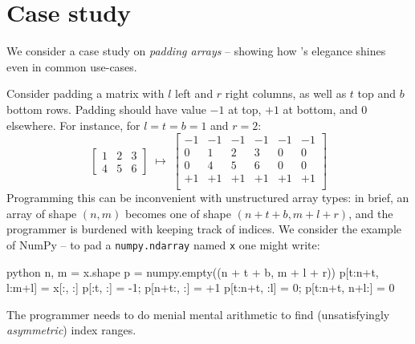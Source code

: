 \section{Case study}

We consider a case study on \emph{padding arrays} -- showing how \starr{}'s elegance shines even in common use-cases.

Consider padding a matrix with $l$ left and $r$ right columns, as well as $t$ top and $b$ bottom rows. Padding should have value $-1$ at top, $+1$ at bottom, and $0$ elsewhere. For instance, for $l = t = b = 1$ and $r = 2$:
$$ \begin{bmatrix}
    1 & 2 & 3 \\ 4 & 5 & 6
\end{bmatrix} \;\mapsto\; \begin{bmatrix}
    -1 & -1 & -1 & -1 & -1 & -1 \\
    0 & 1 & 2 & 3 & 0 & 0 \\
    0 & 4 & 5 & 6 & 0 & 0 \\
    +1 & +1 & +1 & +1 & +1 & +1 \\
\end{bmatrix} $$
Programming this can be inconvenient with unstructured array types: in brief, an array of shape $(n, m)$ becomes one of shape $(n + t + b, m + l + r)$, and the programmer is burdened with keeping track of indices. We consider the example of NumPy -- to pad a \texttt{numpy.ndarray} named \texttt{x} one might write:
\begin{center}
\begin{cminted}{python}
   n, m = x.shape
   p = numpy.empty((n + t + b, m + l + r))
   p[t:n+t, l:m+l] = x[:, :]
   p[:t, :] = -1;    p[n+t:, :] = +1
   p[t:n+t, :l] = 0; p[t:n+t, n+l:] = 0
\end{cminted}    
\end{center}
The programmer needs to do menial mental arithmetic to find (unsatisfyingly \emph{asymmetric}) index ranges.

